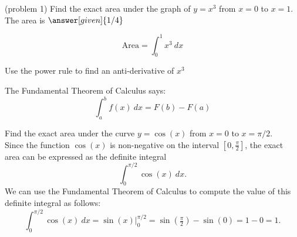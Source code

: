 \documentclass{ximera}
\begin{document}
\begin{problem}(problem 1)
Find the exact area under the graph of $y = x^3$ from $x = 0$ to $x = 1$.\\
The area is $\answer[given]{1/4}$

\begin{hint}
  \[
  \text{Area} = \int_0^{1} x^3 \ dx 
  \]
\end{hint}
    \begin{hint}
      Use the power rule to find an anti-derivative of $x^3$
    \end{hint}
    
    \begin{hint}
      The Fundamental Theorem of Calculus says:
      \[
      \int_a^b f(x) \ dx = F(b) - F(a)
      \]
    \end{hint}    
		
		
\end{problem}



\begin{example}[example 2]
Find the exact area under the curve $y = \cos(x)$ from $x=0$ to $x= \pi/2$.\\
Since the function $\cos(x)$ is non-negative on the interval $[0, \frac{\pi}{2}]$, the exact area can be expressed as the definite integral
\[\int_0^{\pi/2} \cos(x) \ dx.\]
We can use the Fundamental Theorem of Calculus to compute the value of this definite integral as follows:
\[\int_0^{\pi/2} \cos(x) \ dx = \sin(x) \Big|_0^{\pi/2} = \sin(\tfrac{\pi}{2}) - \sin(0)= 1- 0 = 1.\]


\begin{image}
\end{image}

\end{example}
\end{document}
